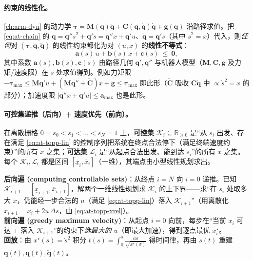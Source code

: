 \paragraph{约束的线性化。}
\cref{ch:arm-dyn} 的动力学 $\boldsymbol{\tau}=\mathbf{M}(\mathbf{q})\ddot{\mathbf{q}}+\mathbf{C}(\mathbf{q},\dot{\mathbf{q}})\dot{\mathbf{q}}+\mathbf{g}(\mathbf{q})$ 沿路径求值。把 \cref{eq:at-chain} 的 $\ddot{\mathbf{q}}=\mathbf{q}''\dot s^2+\mathbf{q}'\ddot s=\mathbf{q}''x+\mathbf{q}'u$、$\dot{\mathbf{q}}=\mathbf{q}'\dot s$（其中 $\dot s^2=x$）代入，则\emph{任何}对 $(\boldsymbol{\tau},\dot{\mathbf{q}},\ddot{\mathbf{q}})$ 的线性约束都化为对 $(u,x)$ 的\textbf{线性不等式}：
\begin{equation}
  \mathbf{a}(s)\,u+\mathbf{b}(s)\,x+\mathbf{c}(s)\ \le\ \mathbf{0},
  \label{eq:at-topp-lin}
\end{equation}
其中系数 $\mathbf{a}(s),\mathbf{b}(s),\mathbf{c}(s)$ 由路径几何 $\mathbf{q}',\mathbf{q}''$ 与机器人模型（$\mathbf{M},\mathbf{C},\mathbf{g}$ 及力矩/速度限）在 $s$ 处求值得到。例如力矩限 $-\boldsymbol{\tau}_{\max}\le\mathbf{M}\mathbf{q}'u+(\mathbf{M}\mathbf{q}''+\tilde{\mathbf{C}})x+\mathbf{g}\le\boldsymbol{\tau}_{\max}$ 即此形（$\tilde{\mathbf{C}}$ 吸收 $\mathbf{C}\dot{\mathbf{q}}$ 中 $\propto\dot s^2=x$ 的部分）；加速度限 $|\mathbf{q}''x+\mathbf{q}'u|\le\mathbf{a}_{\max}$ 也是此形。

\paragraph{可控集递推（后向）+ 速度优先（前向）。}
\begin{definition}[可控集与可达集]\label{def:at-controllable}
在离散栅格 $0=s_0<s_1<\dots<s_N=1$ 上，\textbf{可控集} $\mathcal{K}_i\subseteq\mathbb{R}_{\ge 0}$ 是“从 $s_i$ 出发、存在满足 \cref{eq:at-topp-lin} 的控制序列把系统在终点合法停下（满足终端速度约束）”的所有 $x$ 之集；\textbf{可达集} $\mathcal{L}_i$ 是“从起点合法出发、能到达 $s_i$”的所有 $x$ 之集。每个 $\mathcal{K}_i,\mathcal{L}_i$ 都是区间 $[\underline{x}_i,\overline{x}_i]$（一维），其端点由小型线性规划求出。
\end{definition}

\begin{algo}\label{alg:at-toppra}
\textbf{后向遍 (computing controllable sets)}：从终点 $i=N$ 向 $i=0$ 递推。已知 $\mathcal{K}_{i+1}=[\underline{x}_{i+1},\overline{x}_{i+1}]$，解两个一维线性规划求 $\mathcal{K}_i$ 的上下界——求“在 $s_i$ 处取多大 $x$，仍能经一步合法的 $u$（满足 \cref{eq:at-topp-lin}）落入 $\mathcal{K}_{i+1}$”（用离散化 $x_{i+1}=x_i+2u\,\Delta s$，由 \cref{eq:at-topp-xrel}）。\\
\textbf{前向遍 (greedy maximum velocity)}：从起点 $i=0$ 向前，每步在“当前 $x_i$ 可达 + 落入 $\mathcal{K}_{i+1}$”的约束下\emph{选最大的 $u$}（即最大加速），得到逐点最优 $x_i^\star$。\\
\textbf{回放}：由 $x^\star(s)=\dot s^2$ 积分 $t(s)=\int_0^s\frac{\mathrm{d}\sigma}{\sqrt{x^\star(\sigma)}}$ 得时间律，再由 $s(t)$ 重建 $\mathbf{q}(t),\dot{\mathbf{q}}(t),\ddot{\mathbf{q}}(t)$。
\end{algo}

